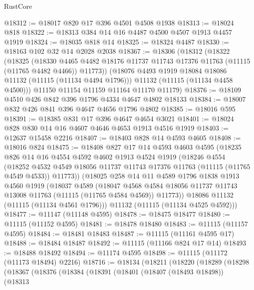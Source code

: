 \begin{lexlean}{RustCore}
\begin{coremodule}
@18312 := @18017 @820 @17 @396 @4501 @4508 @1938
@18313 := @18024 @818
@18322 := @18313 @384 @14 @16 @4487 @4500 @4507 @1913 @4457 @1919
@18324 := @18035 @818 @14
@18325 := @18324 @4487
@18330 := @18163 @102 @32 @14 @2028 @2038
@18367 := @18306
    (@18312
      (@18322
        (@18325
          (@18330
            @4465
            @4482
            @18176
            @11737
            @11743
            @17376
            @11763
            (@11115 (@11765 @4482 @4466))
            @11773))
        (@18076 @4493 @1919 @18084 @18086 @11132 (@11115 (@11134 @4494 @1796)))
        @11132
        (@11115 (@11134 @4458 @4500)))
      @11150
      @11154
      @11159
      @11164
      @11170
      @11179)
@18376 := @18109 @4510 @426 @842 @396 @1796 @4334 @4647 @4802 @18133
@18384 := @18007 @832 @426 @841 @396 @4647 @4656 @1796 @4802
@18385 := @18016 @595
@18391 := @18385 @831 @17 @396 @4647 @4654 @3021
@18401 := @18024 @828 @830 @14 @16 @4607 @4646 @4653 @1913 @4516 @1919
@18403 := @12637 @15458 @2216
@18407 := @18403 @828 @14 @4593 @4605
@18408 := @18016 @824
@18475 := @18408
    @827
    @17
    @14
    @4593
    @4603
    @4595
    (@18235
      @826
      @14
      @16
      @4554
      @4592
      @4602
      @1913
      @4524
      @1919
      (@18246
        @4554
        (@18252
          @4532
          @4549
          @18056
          @11737
          @11743
          @17376
          @11763
          (@11115 (@11765 @4549 @4533))
          @11773))
      (@18025
        @258
        @14
        @11
        @4589
        @1796
        @1838
        @1913
        @4560
        @1919
        (@18037
          @4589
          (@18047
            @4568
            @4584
            @18056
            @11737
            @11743
            @13008
            @11763
            (@11115 (@11765 @4584 @4569))
            @11773))
        @18086
        @11132
        (@11115 (@11134 @4561 @1796)))
      @11132
      (@11115 (@11134 @4525 @4592)))
@18477 := @11147 (@11148 @4595)
@18478 := @18475 @18477
@18480 := @11115 (@11152 @4595)
@18481 := @18478 @18480
@18483 := @11115 (@11157 @4595)
@18484 := @18481 @18483
@18487 := @11115 (@11161 @4595 @17)
@18488 := @18484 @18487
@18492 := @11115 (@11166 @824 @17 @14)
@18493 := @18488 @18492
@18494 := @11174 @4595
@18498 := @11115 (@11172 (@11173 @18494) @2216)
@18716 := @18134
    (@18211
      (@18220
        (@18289
          (@18298
            (@18367
              (@18376
                (@18384
                  (@18391
                    (@18401
                      (@18407 (@18493 @18498))
                      (@18313

\end{coremodule}
\end{lexlean}
